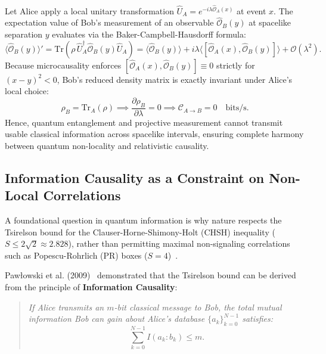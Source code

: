 \documentclass[11pt,a4paper]{article}
\begin{document}
Let Alice apply a local unitary transformation $\hat{U}_A = e^{-i \lambda \hat{\mathcal{O}}_A(x)}$ at event $x$. The expectation value of Bob's measurement of an observable $\hat{\mathcal{O}}_B(y)$ at spacelike separation $y$ evaluates via the Baker-Campbell-Hausdorff formula:
\begin{equation}
\langle \hat{\mathcal{O}}_B(y) \rangle' = \text{Tr}\left( \rho \, \hat{U}_A^\dagger \hat{\mathcal{O}}_B(y) \hat{U}_A \right) = \langle \hat{\mathcal{O}}_B(y) \rangle + i\lambda \langle [\hat{\mathcal{O}}_A(x), \hat{\mathcal{O}}_B(y)] \rangle + \mathcal{O}(\lambda^2).
\end{equation}
Because microcausality enforces $[\hat{\mathcal{O}}_A(x), \hat{\mathcal{O}}_B(y)] \equiv 0$ strictly for $(x-y)^2 < 0$, Bob's reduced density matrix is exactly invariant under Alice's local choice:
\begin{equation}
\rho_B = \text{Tr}_A(\rho) \implies \frac{\partial \rho_B}{\partial \lambda} = 0 \implies \mathcal{C}_{A \to B} = 0 \quad \text{bits/s}.
\end{equation}
Hence, quantum entanglement and projective measurement cannot transmit usable classical information across spacelike intervals, ensuring complete harmony between quantum non-locality and relativistic causality.

\subsection{Information Causality as a Constraint on Non-Local Correlations}

A foundational question in quantum information is why nature respects the Tsirelson bound for the Clauser-Horne-Shimony-Holt (CHSH) inequality ($S \le 2\sqrt{2} \approx 2.828$), rather than permitting maximal non-signaling correlations such as Popescu-Rohrlich (PR) boxes ($S = 4$)~\cite{popescu1994}.

Paw{\l}owski et al. (2009)~\cite{pawlowski2009} demonstrated that the Tsirelson bound can be derived from the principle of \textbf{Information Causality}:
\begin{quote}
\emph{If Alice transmits an $m$-bit classical message to Bob, the total mutual information Bob can gain about Alice's database $\{a_k\}_{k=0}^{N-1}$ satisfies:}
\begin{equation}
\sum_{k=0}^{N-1} I(a_k : b_k) \le m.
\end{equation}
\end{quote}
\end{document}
